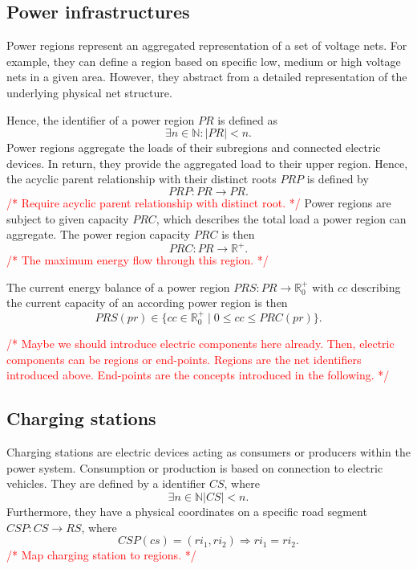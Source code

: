 \documentclass[conference]{IEEEtran}
\newcommand{\todo}[1]{\textcolor{red}{/* #1 */}}
\begin{document}
	\subsection{Power infrastructures}
	\label{power}
	
	Power regions represent an aggregated representation of a set of voltage nets. For example, they can define a region based on specific low, medium or high voltage nets in a given area. However, they abstract from a detailed representation of the underlying physical net structure.  
	
	Hence, the identifier of a power region $PR$ is defined as
	\[
	\exists n \in \mathbb{N} : |PR| < n \mathrm{.}
	\]
	Power regions aggregate the loads of their subregions and connected electric devices. In return, they provide the aggregated load to their upper region.
	Hence, the acyclic parent relationship with their distinct roots $PRP$ is defined by 
	\[
	PRP : PR \to PR \mathrm{.}
	\]
	\todo{Require acyclic parent relationship with distinct root.}
	Power regions are subject to given capacity $PRC$, which describes the total load a power region can aggregate.
	The power region capacity $PRC$ is then
	\[
	PRC : PR \rightarrow \mathbb{R}^+ \mathrm{.}
	\]
	\todo{The maximum energy flow through this region.}
	 
	The current energy balance of a power region
	$PRS : PR \rightarrow \mathbb{R}_0^+$ with $cc$ describing the current capacity of an according power region is then
	\[
	PRS(pr) \in \{ cc \in \mathbb{R}_0^+ \mid 0 \leq cc \leq PRC(pr) \} \mathrm{.}
	\]
	
	\todo{Maybe we should introduce electric components here already. Then, electric components can be regions or end-points. Regions are the net identifiers introduced above. End-points are the concepts introduced in the following.}
	
	\subsection{Charging stations}
	\label{charging_stations}
	Charging stations are electric devices acting as consumers or producers within the power system. Consumption or production is based on connection to electric vehicles.
	They are defined by a identifier $CS$, where
	\[
	\exists n \in \mathbb{N} |CS| < n \mathrm{.}
	\]
	Furthermore, they have a physical coordinates on a specific road segment
	$CSP : CS \rightarrow RS$, where
	\[
	CSP(cs) = (ri_1, ri_2) \Rightarrow ri_1 = ri_2 \mathrm{.}
	\]
	\todo{Map charging station to regions.}
	
\end{document}
